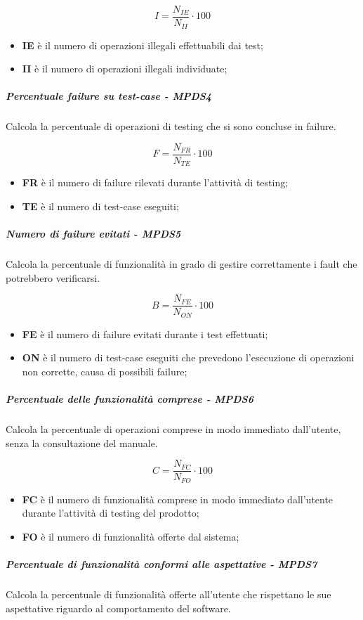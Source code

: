 \begin{equation*}I=\frac{N_{IE}}{N_{II}} \cdot 100\end{equation*}
\begin{itemize}
	\item \textbf{IE} è il numero di operazioni illegali effettuabili dai test;
	\item \textbf{II} è il numero di operazioni illegali individuate;
\end{itemize}
\subparagraph{Percentuale failure su test-case - MPDS4}
Calcola la percentuale di operazioni di testing che si sono concluse in failure.

\begin{equation*}F=\frac{N_{FR}}{N_{TE}} \cdot 100 \end{equation*}
\begin{itemize}
	\item \textbf{FR} è il numero di failure rilevati durante l'attività di testing;
	\item \textbf{TE} è il numero di test-case eseguiti;
\end{itemize}
\subparagraph{Numero di failure evitati - MPDS5}
Calcola la percentuale di funzionalità in grado di gestire correttamente i fault che potrebbero verificarsi.

\begin{equation*}B=\frac{N_{FE}}{N_{ON}} \cdot 100 \end{equation*}
\begin{itemize}
	\item \textbf{FE} è il numero di failure evitati durante i test effettuati;
	\item \textbf{ON} è il numero di test-case eseguiti che prevedono l'esecuzione di operazioni non corrette, causa di possibili failure;
\end{itemize}
\subparagraph{Percentuale delle funzionalità comprese  - MPDS6}
Calcola la percentuale di operazioni comprese in modo immediato dall'utente, senza la consultazione del manuale.

\begin{equation*}C=\frac{N_{FC}}{N_{FO}} \cdot 100\end{equation*}
\begin{itemize}
	\item \textbf{FC} è il numero di funzionalità comprese in modo immediato dall'utente durante l'attività di testing del prodotto;
	\item \textbf{FO} è il numero di funzionalità offerte dal sistema;
\end{itemize}
\subparagraph{Percentuale di funzionalità conformi alle aspettative - MPDS7}
Calcola la percentuale di funzionalità offerte all'utente che rispettano le sue aspettative riguardo al comportamento del software.

